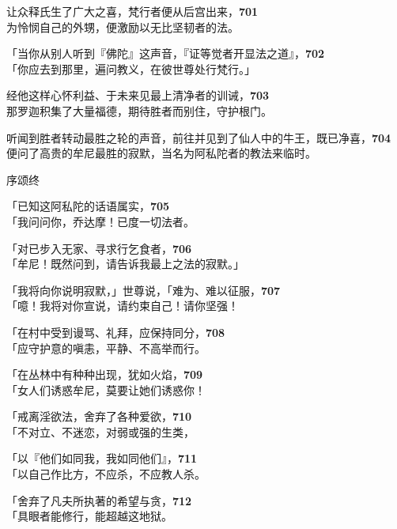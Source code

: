 让众释氏生了广大之喜，梵行者便从后宫出来，\hfill{\grayfootnotesize \textbf{701}} \\
为怜悯自己的外甥，便激励以无比坚韧者的法。


「当你从别人听到『佛陀』这声音，『证等觉者开显法之道』，\hfill{\grayfootnotesize \textbf{702}} \\
「你应去到那里，遍问教义，在彼世尊处行梵行。」


经他这样心怀利益、于未来见最上清净者的训诫，\hfill{\grayfootnotesize \textbf{703}} \\
那罗迦积集了大量福德，期待胜者而别住，守护根门。


听闻到胜者转动最胜之轮的声音，前往并见到了仙人中的牛王，既已净喜，\hfill{\grayfootnotesize \textbf{704}} \\
便问了高贵的牟尼最胜的寂默，当名为阿私陀者的教法来临时。


\begin{center}序颂终\end{center}

「已知这阿私陀的话语属实，\hfill{\grayfootnotesize \textbf{705}} \\
「我问问你，乔达摩！已度一切法者。


「对已步入无家、寻求行乞食者，\hfill{\grayfootnotesize \textbf{706}} \\
「牟尼！既然问到，请告诉我最上之法的寂默。」


「我将向你说明寂默，」世尊说，「难为、难以征服，\hfill{\grayfootnotesize \textbf{707}} \\
「噫！我将对你宣说，请约束自己！请你坚强！


「在村中受到谩骂、礼拜，应保持同分，\hfill{\grayfootnotesize \textbf{708}} \\
「应守护意的嗔恚，平静、不高举而行。


「在丛林中有种种出现，犹如火焰，\hfill{\grayfootnotesize \textbf{709}} \\
「女人们诱惑牟尼，莫要让她们诱惑你！


「戒离淫欲法，舍弃了各种爱欲，\hfill{\grayfootnotesize \textbf{710}} \\
「不对立、不迷恋，对弱或强的生类，


「以『他们如同我，我如同他们』，\hfill{\grayfootnotesize \textbf{711}} \\
「以自己作比方，不应杀，不应教人杀。


「舍弃了凡夫所执著的希望与贪，\hfill{\grayfootnotesize \textbf{712}} \\
「具眼者能修行，能超越这地狱。


